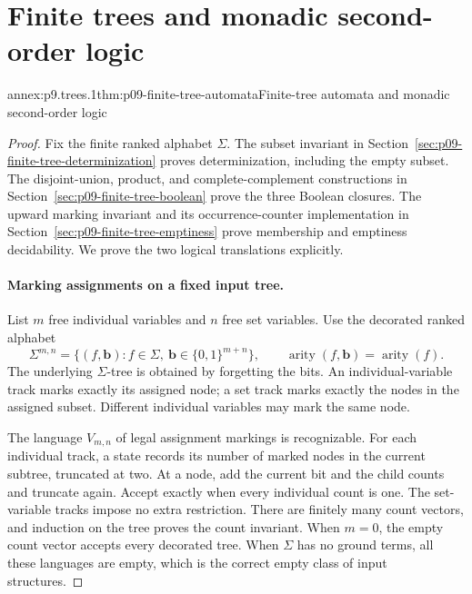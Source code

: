 
\section{Finite trees and monadic second-order logic}

\begin{annexitem}{annex:p9.trees.1}{thm:p09-finite-tree-automata}{Finite-tree automata and monadic second-order logic}
\begin{proof}
Fix the finite ranked alphabet \(\Sigma\).
The subset invariant in Section~\ref{sec:p09-finite-tree-determinization}
proves determinization, including the empty subset.
The disjoint-union, product, and complete-complement constructions in
Section~\ref{sec:p09-finite-tree-boolean} prove the three Boolean closures.
The upward marking invariant and its occurrence-counter implementation in
Section~\ref{sec:p09-finite-tree-emptiness} prove membership and emptiness
decidability.  We prove the two logical translations explicitly.

\paragraph{Marking assignments on a fixed input tree.}
List \(m\) free individual variables and \(n\) free set variables.
Use the decorated ranked alphabet
\[
 \Sigma^{m,n}
   =\{(f,\mathbf b):f\in\Sigma,\ \mathbf b\in\{0,1\}^{m+n}\},
 \qquad
 \operatorname{arity}(f,\mathbf b)=\operatorname{arity}(f).
\]
The underlying \(\Sigma\)-tree is obtained by forgetting the bits.
An individual-variable track marks exactly its assigned node; a set
track marks exactly the nodes in the assigned subset.
Different individual variables may mark the same node.

The language \(V_{m,n}\) of legal assignment markings is recognizable.
For each individual track, a state records its number of marked nodes
in the current subtree, truncated at two.
At a node, add the current bit and the child counts and truncate
again.  Accept exactly when every individual count is one.
The set-variable tracks impose no extra restriction.
There are finitely many count vectors, and induction on the tree
proves the count invariant.
When \(m=0\), the empty count vector accepts every decorated tree.
When \(\Sigma\) has no ground terms, all these languages are empty,
which is the correct empty class of input structures.


\end{proof}
\end{annexitem}
